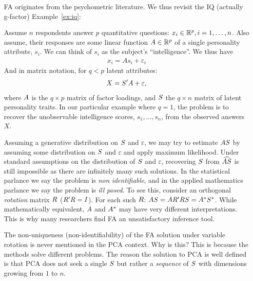 \documentclass[12pt,a4paper]{article}
\begin{document}
FA originates from the psychometric literature. 
We thus revisit the IQ (actually g-factor) Example~\ref{ex:iq}:
\begin{example}
	
	Assume $n$ respondents answer $p$ quantitative questions: $x_i \in \mathbb{R}^p, i=1,\dots,n$. 
	Also assume, their responses are some linear function $A \in \mathbb{R}^p$ of a single personality attribute, $s_i$. 
	We can think of $s_i$ as the subject's ``intelligence''.
	We thus have 
	\begin{align}
	x_i = A s_i + \varepsilon_i
	\end{align}
And in matrix notation, for $q<p$ latent attributes:
	\begin{align}
	\label{eq:factor}
	X = S' A  +\varepsilon,
	\end{align}
where $A$ is the $q \times p$ matrix of factor loadings, and $S$ the $q \times n$ matrix of latent personality traits. 
In our particular example where $q=1$, the problem is to recover the unobservable intelligence scores, $s_1,\dots,s_n$, from the observed answers $X$.	
\end{example}


Assuming a generative distribution on $S$ and $\varepsilon$, we may try to estimate $A S$ by assuming some distribution on $S$ and $\varepsilon$ and apply maximum likelihood.
Under standard assumptions on the distribution of $S$ and $\varepsilon$, recovering  $S$ from $\widehat{AS}$ is still impossible as there are infinitely many such solutions.
In the statistical parlance we say the problem is \emph{non identifiable}, and in the applied mathematics parlance we say the problem is \emph{ill posed}.
To see this, consider an orthogonal \emph{rotation} matrix $R$ ($R' R=I$). For each such $R$: $ A S=A R' R S = A^* S^*$.
While mathematically equivalent, $A$ and $A^*$ may have very different interpretations. 
This is why many researchers find FA an unsatisfactory inference tool.


\begin{remark}
	The non-uniqueness (non-identifiability) of the FA solution under variable rotation is never mentioned in the PCA context. Why is this?
	This is because the methods solve different problems. 
	The reason the solution to PCA is well defined is that PCA does not seek a single $S$ but rather a \emph{sequence} of $S$ with dimensions growing from $1$ to $n$. 
\end{remark}
\end{document}
